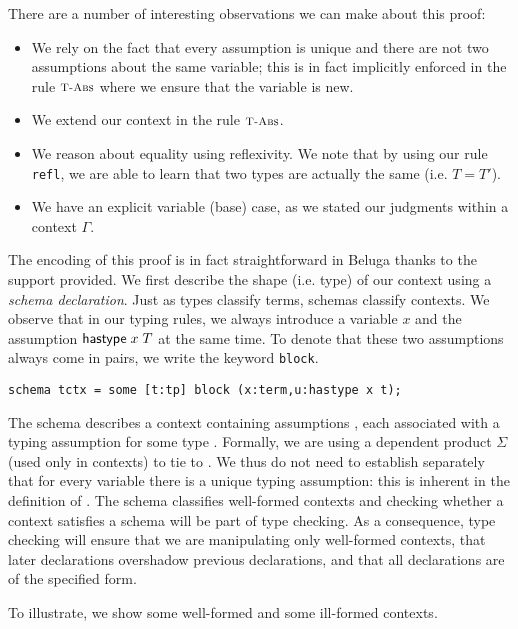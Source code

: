 There are a number of interesting observations we can make about this
proof:

\begin{itemize}
\item We rely on the fact that every assumption is unique and there
  are not two assumptions about the same variable; this is in fact
  implicitly enforced in the rule $\textsc{\footnotesize T-Abs}$ where we ensure
  that the variable is new.
\item We extend our context in the rule $\textsc{\footnotesize T-Abs}$.
\item We reason about equality using reflexivity. We note that by
  using our rule \lstinline!refl!, we are able to learn that two types
  are actually the same (i.e. $T = T'$).
\item We have an explicit variable (base) case, as we stated our judgments
  within a context $\Gamma$.
\end{itemize}


The encoding of this proof is in fact straightforward in Beluga thanks to the support provided. We
first describe the shape (i.e. type) of our context using a
\emph{schema declaration}. Just as types classify terms, schemas
classify contexts. We observe that in our typing rules, we always
introduce a variable $x$ and the assumption $\mathsf{hastype}\;x\;T$ at the same
time.
To denote that these two assumptions always come in pairs, we
write the keyword \lstinline!block!.

\begin{lstlisting}
schema tctx = some [t:tp] block (x:term,u:hastype x t);
\end{lstlisting}

The schema  describes a context containing assumptions
, each associated with a typing assumption 
for some type .  Formally, we are using a dependent product $\Sigma$
(used only in contexts) to tie  to .
We thus do not need to establish separately that for every variable there is a
unique typing assumption: this is inherent in the definition of .
The schema classifies well-formed contexts and checking whether a
context satisfies a schema will be part of type checking. As a
consequence, type checking will ensure that we are manipulating only
well-formed contexts, that later declarations overshadow previous
declarations, and that all declarations are of the specified form.

To illustrate, we show some well-formed  and some ill-formed
contexts.

